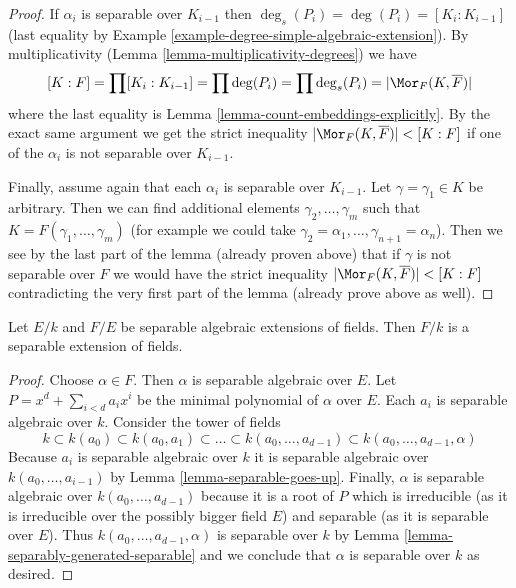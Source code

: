 \begin{proof}
If $\alpha_i$ is separable over $K_{i - 1}$ then
$\deg_s(P_i) = \deg(P_i) = [K_i : K_{i - 1}]$
(last equality by Example \ref{example-degree-simple-algebraic-extension}).
By multiplicativity (Lemma \ref{lemma-multiplicativity-degrees}) we have
$$
[K : F] = \prod [K_i : K_{i - 1}] = \prod \deg(P_i) =
\prod \deg_s(P_i) = |\Mor_F(K, \overline{F})|
$$
where the last equality is Lemma \ref{lemma-count-embeddings-explicitly}.
By the exact same argument we get the strict inequality
$|\Mor_F(K, \overline{F})| < [K : F]$ if one of the $\alpha_i$ is
not separable over $K_{i - 1}$.

\medskip\noindent
Finally, assume again that each $\alpha_i$ is separable over $K_{i - 1}$.
Let $\gamma = \gamma_1 \in K$ be arbitrary. Then we can find additional
elements $\gamma_2, \ldots, \gamma_m$ such that
$K = F(\gamma_1, \ldots, \gamma_m)$ (for example we could take
$\gamma_2 = \alpha_1, \ldots, \gamma_{n + 1} = \alpha_n$).
Then we see by the last part of the lemma (already proven above)
that if $\gamma$ is not separable over $F$ we would have the
strict inequality $|\Mor_F(K, \overline{F})| < [K : F]$
contradicting the very first part of the lemma (already prove above
as well).
\end{proof}

\begin{lemma}
\label{lemma-separable-permanence}
Let $E/k$ and $F/E$ be separable algebraic extensions of fields. Then $F/k$
is a separable extension of fields.
\end{lemma}

\begin{proof}
Choose $\alpha \in F$. Then $\alpha$ is separable algebraic over $E$.
Let $P = x^d + \sum_{i < d} a_i x^i$ be the minimal polynomial of
$\alpha$ over $E$. Each $a_i$ is separable algebraic over $k$.
Consider the tower of fields
$$
k \subset k(a_0) \subset k(a_0, a_1) \subset \ldots \subset
k(a_0, \ldots, a_{d - 1}) \subset k(a_0, \ldots, a_{d - 1}, \alpha)
$$
Because $a_i$ is separable algebraic over $k$ it is separable algebraic
over $k(a_0, \ldots, a_{i - 1})$ by Lemma \ref{lemma-separable-goes-up}.
Finally, $\alpha$ is separable algebraic over $k(a_0, \ldots, a_{d - 1})$
because it is a root of $P$ which is irreducible
(as it is irreducible over the possibly bigger field $E$)
and separable (as it is separable over $E$).
Thus $k(a_0, \ldots, a_{d - 1}, \alpha)$ is separable over $k$
by Lemma \ref{lemma-separably-generated-separable}
and we conclude that $\alpha$ is separable over $k$ as desired.
\end{proof}

